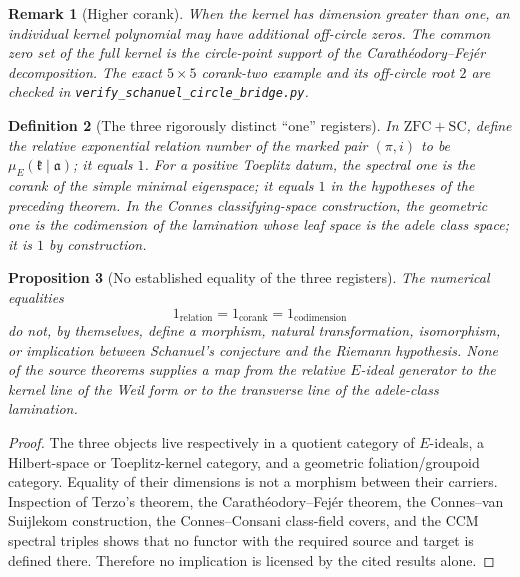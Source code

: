 \documentclass[11pt]{article}
\newtheorem{definition}{Definition}
\newtheorem{proposition}[definition]{Proposition}
\newtheorem{remark}[definition]{Remark}
\begin{document}
\begin{remark}[Higher corank]
When the kernel has dimension greater than one, an individual kernel polynomial may have additional off-circle zeros.  The common zero set of the full kernel is the circle-point support of the Carath\'eodory--Fej\'er decomposition.  The exact $5\times5$ corank-two example and its off-circle root $2$ are checked in \texttt{verify\_schanuel\_circle\_bridge.py}.
\end{remark}

\begin{definition}[The three rigorously distinct ``one'' registers]
In $\mathrm{ZFC}+\mathrm{SC}$, define the relative exponential relation number of the marked pair $(\pi,i)$ to be $\mu_E(\mathfrak k\mid\mathfrak a)$; it equals $1$.  For a positive Toeplitz datum, the spectral one is the corank of the simple minimal eigenspace; it equals $1$ in the hypotheses of the preceding theorem.  In the Connes classifying-space construction, the geometric one is the codimension of the lamination whose leaf space is the adele class space; it is $1$ by construction.
\end{definition}

\begin{proposition}[No established equality of the three registers]
The numerical equalities
\[
1_{\mathrm{relation}}=1_{\mathrm{corank}}=1_{\mathrm{codimension}}
\]
do not, by themselves, define a morphism, natural transformation, isomorphism, or implication between Schanuel's conjecture and the Riemann hypothesis.  None of the source theorems supplies a map from the relative $E$-ideal generator to the kernel line of the Weil form or to the transverse line of the adele-class lamination.
\end{proposition}

\begin{proof}
The three objects live respectively in a quotient category of $E$-ideals, a Hilbert-space or Toeplitz-kernel category, and a geometric foliation/groupoid category.  Equality of their dimensions is not a morphism between their carriers.  Inspection of Terzo's theorem, the Carath\'eodory--Fej\'er theorem, the Connes--van Suijlekom construction, the Connes--Consani class-field covers, and the CCM spectral triples shows that no functor with the required source and target is defined there.  Therefore no implication is licensed by the cited results alone.
\end{proof}
\end{document}
